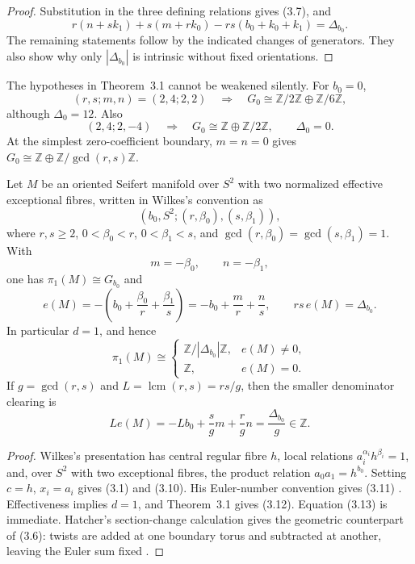 \documentclass[11pt]{article}
\numberwithin{equation}{section}
\begin{document}
\begin{proof}
Substitution in the three defining relations gives (3.7), and
\[
 r(n+sk_1)+s(m+rk_0)-rs(b_0+k_0+k_1)=\Delta_{b_0}.
\]
The remaining statements follow by the indicated changes of generators.
They also show why only $|\Delta_{b_0}|$ is intrinsic without fixed
orientations.
\end{proof}

The hypotheses in Theorem~3.1 cannot be weakened silently.  For $b_0=0$,
\[
 (r,s;m,n)=(2,4;2,2)\quad\Longrightarrow\quad
 G_0\cong\mathbb Z/2\mathbb Z\oplus\mathbb Z/6\mathbb Z,
\]
although $\Delta_0=12$.  Also
\[
 (2,4;2,-4)\quad\Longrightarrow\quad
 G_0\cong\mathbb Z\oplus\mathbb Z/2\mathbb Z,\qquad \Delta_0=0.
\]
At the simplest zero-coefficient boundary, $m=n=0$ gives
$G_0\cong\mathbb Z\oplus\mathbb Z/\gcd(r,s)\mathbb Z$.

\begin{proposition}
Let $M$ be an oriented Seifert manifold over $S^2$ with two normalized
effective exceptional fibres, written in Wilkes's convention as
\[
       (b_0,S^2;(r,\beta_0),(s,\beta_1)),                          \tag{3.9}
\]
where $r,s\ge2$, $0<\beta_0<r$, $0<\beta_1<s$, and
$\gcd(r,\beta_0)=\gcd(s,\beta_1)=1$.  With
\[
                 m=-\beta_0,\qquad n=-\beta_1,                   \tag{3.10}
\]
one has $\pi_1(M)\cong G_{b_0}$ and
\[
 e(M)=-\left(b_0+\frac{\beta_0}{r}+\frac{\beta_1}{s}\right)
      =-b_0+\frac mr+\frac ns,\qquad
 rs\,e(M)=\Delta_{b_0}.                                           \tag{3.11}
\]
In particular $d=1$, and hence
\[
 \pi_1(M)\cong
 \begin{cases}
  \mathbb Z/|\Delta_{b_0}|\mathbb Z,&e(M)\ne0,\\
  \mathbb Z,&e(M)=0.
 \end{cases}                                                       \tag{3.12}
\]
If $g=\gcd(r,s)$ and $L=\operatorname{lcm}(r,s)=rs/g$, then the smaller
denominator clearing is
\[
             L e(M)=-Lb_0+\frac{s}{g}m+\frac{r}{g}n
                    =\frac{\Delta_{b_0}}{g}\in\mathbb Z.          \tag{3.13}
\]
\end{proposition}

\begin{proof}
Wilkes's presentation has central regular fibre $h$, local relations
$a_i^{\alpha_i}h^{\beta_i}=1$, and, over $S^2$ with two exceptional
fibres, the product relation $a_0a_1=h^{b_0}$.  Setting
$c=h$, $x_i=a_i$ gives (3.1) and (3.10).  His Euler-number convention gives
(3.11) \cite[Proposition 4.3, p.~149]{Wilkes}.  Effectiveness implies
$d=1$, and Theorem~3.1 gives (3.12).  Equation (3.13) is immediate.
Hatcher's section-change calculation gives the geometric counterpart of
(3.6): twists are added at one boundary torus and subtracted at another,
leaving the Euler sum fixed \cite[Section 2.1, pp.~25--27]{Hatcher}.
\end{proof}
\end{document}
